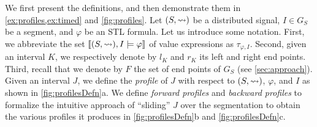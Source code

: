 We first present the definitions, and then demonstrate them in \cref{ex:profiles,ex:timed} and \cref{fig:profiles}. 
Let $(S,{\rightsquigarrow})$ be a distributed signal, $I \in G_S$ be a segment, and $\varphi$ be an STL formula.
Let us introduce some notation.
First, we abbreviate the set $\llbracket (S,{\rightsquigarrow}), I \models \varphi \rrbracket$ of value expressions as $\tau_{\varphi,I}$.
Second, given an interval $K$, we respectively denote by $l_K$ and $r_K$ its left and right end points.
Third, recall that we denote by $F$ the set of end points of $G_S$ (see \cref{sec:approach}).
Given an interval $J$, we define the \emph{profile} of $J$ with respect to $(S,{\rightsquigarrow})$, $\varphi$, and 
$I$ as shown in \cref{fig:profilesDefn}a.
We define \emph{forward profiles} and \emph{backward profiles} to formalize the intuitive approach of ``sliding'' $J$ over the segmentation to obtain the various profiles it produces in \cref{fig:profilesDefn}b and \cref{fig:profilesDefn}c.

